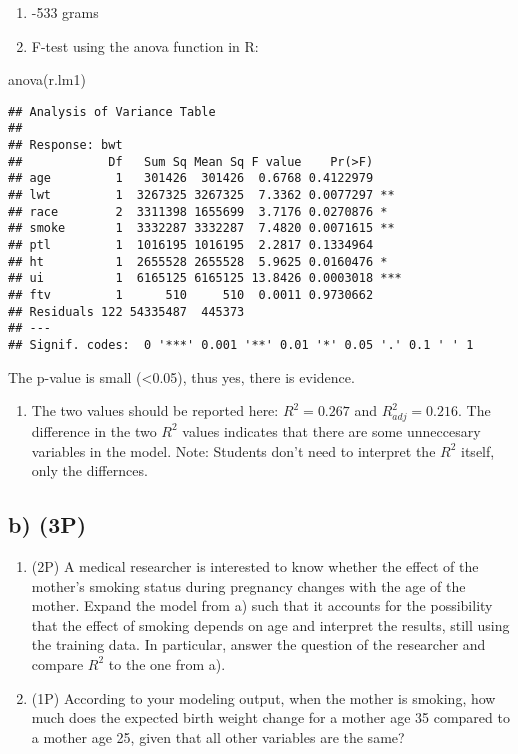 \documentclass[
]{article}
\newenvironment{Shaded}{\begin{snugshade}}{\end{snugshade}}
\newcommand{\FunctionTok}[1]{\textcolor[rgb]{0.00,0.00,0.00}{#1}}
\newcommand{\NormalTok}[1]{#1}
\providecommand{\tightlist}{%
  \setlength{\itemsep}{0pt}\setlength{\parskip}{0pt}}
\begin{document}
\begin{enumerate}
\def\labelenumi{(\roman{enumi})}
\setcounter{enumi}{1}
\tightlist
\item
  -533 grams
\item
  F-test using the anova function in R:
\end{enumerate}

\begin{Shaded}
\begin{Highlighting}[]
\FunctionTok{anova}\NormalTok{(r.lm1)}
\end{Highlighting}
\end{Shaded}

\begin{verbatim}
## Analysis of Variance Table
## 
## Response: bwt
##            Df   Sum Sq Mean Sq F value    Pr(>F)    
## age         1   301426  301426  0.6768 0.4122979    
## lwt         1  3267325 3267325  7.3362 0.0077297 ** 
## race        2  3311398 1655699  3.7176 0.0270876 *  
## smoke       1  3332287 3332287  7.4820 0.0071615 ** 
## ptl         1  1016195 1016195  2.2817 0.1334964    
## ht          1  2655528 2655528  5.9625 0.0160476 *  
## ui          1  6165125 6165125 13.8426 0.0003018 ***
## ftv         1      510     510  0.0011 0.9730662    
## Residuals 122 54335487  445373                      
## ---
## Signif. codes:  0 '***' 0.001 '**' 0.01 '*' 0.05 '.' 0.1 ' ' 1
\end{verbatim}

The p-value is small (\textless0.05), thus yes, there is evidence.

\begin{enumerate}
\def\labelenumi{(\roman{enumi})}
\setcounter{enumi}{3}
\tightlist
\item
  The two values should be reported here: \(R^2=0.267\) and
  \(R^2_{adj}=0.216\). The difference in the two \(R^2\) values
  indicates that there are some unneccesary variables in the model.
  Note: Students don't need to interpret the \(R^2\) itself, only the
  differnces.
\end{enumerate}

\hypertarget{b-3p}{%
\subsection{b) (3P)}\label{b-3p}}

\begin{enumerate}
\def\labelenumi{(\roman{enumi})}
\tightlist
\item
  (2P) A medical researcher is interested to know whether the effect of
  the mother's smoking status during pregnancy changes with the age of
  the mother. Expand the model from a) such that it accounts for the
  possibility that the effect of smoking depends on age and interpret
  the results, still using the training data. In particular, answer the
  question of the researcher and compare \(R^2\) to the one from a).
\item
  (1P) According to your modeling output, when the mother is smoking,
  how much does the expected birth weight change for a mother age 35
  compared to a mother age 25, given that all other variables are the
  same?
\end{enumerate}
\end{document}
